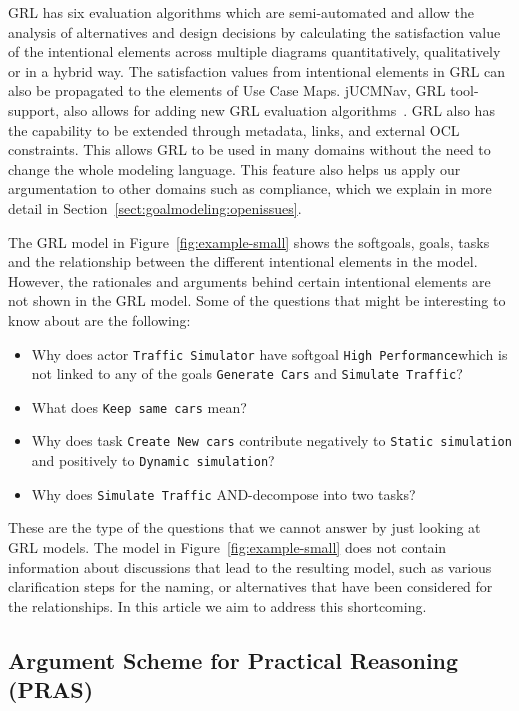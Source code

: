 GRL has six evaluation algorithms which are semi-automated and allow the analysis of alternatives and design decisions by calculating the satisfaction value of the intentional elements across multiple diagrams quantitatively, qualitatively or in a hybrid way. The satisfaction values from intentional elements in GRL can also be propagated to the elements of Use Case Maps.  jUCMNav, GRL tool-support, also allows for adding new GRL evaluation algorithms~\cite{jUCMNav}. GRL also has the capability to be extended through metadata, links, and external OCL constraints. This allows GRL to be used in many domains without the need to change the whole modeling language. This feature also helps us apply our argumentation to other domains such as compliance, which we explain in more detail in Section~\ref{sect:goalmodeling:openissues}.

The GRL model in Figure~\ref{fig:example-small} shows the softgoals, goals, tasks and the relationship between the different intentional elements in the model. However, the rationales and arguments behind certain intentional elements are not shown in the GRL model. Some of the questions that might be interesting to know about are the following:

\begin{itemize}
	\item Why does actor \texttt{Traffic Simulator} have softgoal \texttt{High Performance}which is not linked to any of the goals \texttt{Generate Cars} and \texttt{Simulate Traffic}? %
	\item What does \texttt{Keep same cars} mean?
	\item Why does task \texttt{Create New cars} contribute negatively to \texttt{Static simulation} and positively to \texttt{Dynamic simulation}?
	\item Why does \texttt{Simulate Traffic} AND-decompose into two tasks?
\end{itemize}

These are the type of the questions that we cannot answer by just looking at GRL models. The model in Figure~\ref{fig:example-small} does not contain information about discussions that lead to the resulting model, such as various clarification steps for the naming, or alternatives that have been considered for the relationships. In this article we aim to address this shortcoming.

\subsection{Argument Scheme for Practical Reasoning (PRAS)}
\label{sect:background:pras}

